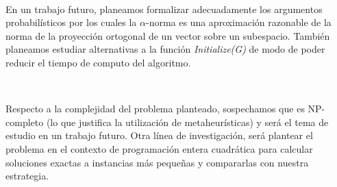 \documentclass[conference,compsoc,a4paper]{IEEEtran}
\begin{document}
\

En un trabajo futuro, planeamos formalizar adecuadamente los argumentos 
probabilísticos por los cuales la $\alpha$-norma es una aproximación 
razonable de la norma de la proyección ortogonal de un vector sobre un subespacio.
También planeamos estudiar alternativas a la función \emph{Initialize(G)}
de modo de poder reducir el tiempo de computo del algoritmo.

\ 

Respecto a la complejidad del problema planteado, sospechamos que
es NP-completo (lo que justifica la utilización de metaheurísticas)
y será el tema de estudio en un trabajo futuro.
Otra línea de investigación, será plantear el problema
en el contexto de programación entera cuadrática para calcular soluciones exactas a instancias más pequeñas
y compararlas con nuestra estrategia.

%
%

\end{document}
